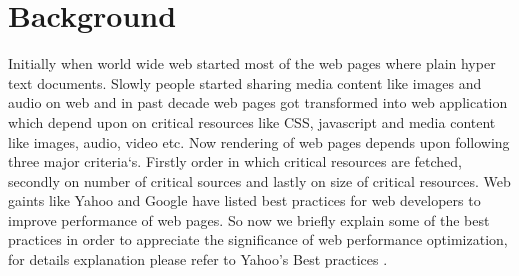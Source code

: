 \documentclass[conference]{IEEEtran}
\begin{document}
\section{Background}\label{sec-3}
Initially when world wide web started most of the web pages where plain hyper text documents.
Slowly people started sharing media content like images and audio on web and in past decade
web pages got transformed into web application which depend upon on critical resources
like CSS, javascript and media content like images, audio, video etc. Now rendering of web pages depends upon
following three major criteria`s. Firstly order in which critical resources are fetched, secondly on
number of critical sources and lastly on size of critical resources. Web gaints like Yahoo and Google
have listed best practices for web developers to improve performance of web pages. So now we briefly
explain some of the best practices in order to appreciate the significance of web performance optimization,
for details explanation please refer to Yahoo's Best practices \cite{best-practices}.
\end{document}
